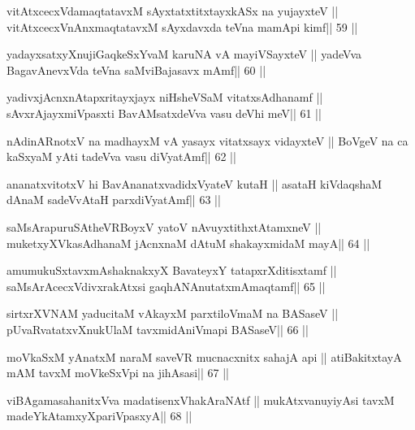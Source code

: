 \begin{shl}
vitAtxcecxVdamaqtatavxM sAyxtatxtitxtayxkASx na yujayxteV ||
vitAtxcecxVnAnxmaqtatavxM sAyxdavxda teVna mamApi kimf\hfill || 59 ||
\end{shl}

\begin{shl}
yadayxsatxyXnujiGaqkeSxYvaM karuNA vA mayiVSayxteV ||
yadeVva BagavAnevxVda teVna saMviBajasavx mAmf\hfill || 60 ||
\end{shl}

\begin{shl}
yadivxjAcnxnAtapxritayxjayx niHsheVSaM vitatxsAdhanamf ||
sAvxrAjayxmiVpasxti BavAMsatxdeVva vasu deVhi meV\hfill || 61 ||
\end{shl}

\begin{shl}
nA\s\s dinARnotxV na madhayxM vA yasayx vitatxsayx vidayxteV ||
BoVgeV na ca kaSxyaM yAti tadeVva vasu diVyatAmf\hfill || 62 ||
\end{shl}

\begin{shl}
ananatxvitotxV hi BavAnanatxvadidxVyateV kutaH ||
asataH kiVdaqshaM dAnaM sadeVvAtaH parxdiVyatAmf\hfill || 63 ||
\end{shl}

\begin{shl}
saMsArapuruSAtheVRBoyxV yatoV nAvuyxtithxtAtamxneV ||
muketxyXVkasAdhanaM jAcnxnaM dAtuM shakayxmidaM mayA\hfill || 64 ||
\end{shl}

\begin{shl}
amumukuSxtavxmAshaknakxyX BavateyxY tatapxrXditisxtamf ||
saMsArAcecxVdivxrakAtx\s si gaqhANAnutatxmAmaqtamf\hfill || 65 ||
\end{shl}

\begin{shl}
sirtxrXVNAM yaducitaM vAkayxM parxtiloVmaM na BASaseV ||
pUvaRvatatxvXnukUlaM tavxmidAniVmapi BASaseV\hfill || 66 ||
\end{shl}

\begin{shl}
moVkaSxM yAnatxM naraM saveVR mucnacxnitx sahajA api ||
atiBakitxtayA mAM tavxM moVkeSxV\s pi na jihAsasi\hfill || 67 ||
\end{shl}

\begin{shl}
viBAgamasahanitxVva madatisenxVhakAraNAtf ||
mukAtxvanuyiyAsi tavxM madeYkAtamxyXpariVpasxyA\hfill || 68 ||
\end{shl}

